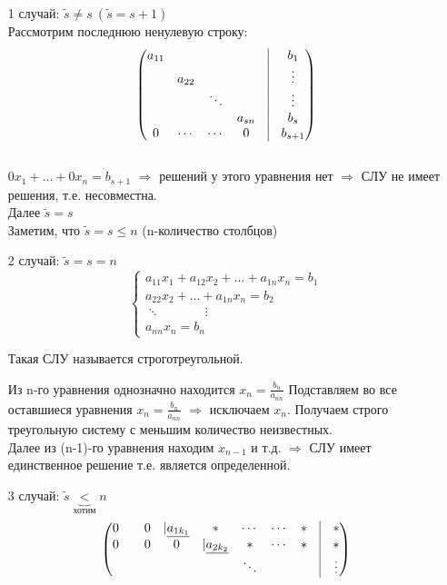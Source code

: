 \documentclass[a4paper, 12pt]{article}
\theoremstyle{definition}
\begin{document}
  \begin{itemize}
    \item[1 случай:]
    $\widetilde{s} \neq s \ (\widetilde{s}=s+1)$ \\ 
    Рассмотрим последнюю ненулевую строку:
    $$\begin{pmatrix}
      a_{11} & \null & \null & \null & \vline & b_1 \\
      \null & a_{22} & \null & \null & \vline & \vdots \\
      \null & \null & \ddots & \null & \vline & \vdots \\
      \null & \null & \null & a_{sn} & \vline & b_s \\
      0 & \cdots & \cdots & 0 & \vline & b_{s+1}
    \end{pmatrix}$$ \\
    $0x_1+...+0x_n=b_{s+1}$ 
    $\Longrightarrow$ решений у этого уравнения нет 
    $\Longrightarrow$ СЛУ не имеет решения, т.е. несовместна. \\
    Далее $\widetilde{s}=s$\\
    Заметим, что $\widetilde{s}=s\leq n$ (n-количество столбцов)
    \item[2 случай:] $\widetilde{s}=s=n$  
    $$\left\{ \begin{aligned}
      a_{11} x_1 + a_{12} x_2+ \dots + a_{1n} x_n = b_1 \\
      a_{22} x_2 + \dots + a_{1n} x_n = b_2 \\ 
      \ddots \ \ \ \ \ \ \ \ \ \ \ \ \ \ \ \ \vdots \ \\
      a_{nn} x_n = b_n
    \end{aligned}
    \right.$$

    Такая СЛУ называется строготреугольной.

    Из n-го уравнения однозначно находится $x_n = \frac{b_n}{a_{nn}}$
    Подставляем во все оставшиеся уравнения $x_n = \frac{b_n}{a_{nn}}$ $\Longrightarrow$ исключаем $x_n$. Получаем строго треугольную систему с меньшим количество неизвестных.  \\
    Далее из (n-1)-го уравнения  находим $x_{n-1}$ и т.д. $\Longrightarrow$ СЛУ имеет единственное решение т.е. является определенной.

    \item[3 случай:] $\widetilde{s}\underbrace{<}_{\text{хотим}} n$ 
  $$\begin{pmatrix}
    0 & \null & 0 & |\underline{a_{1k_1}} & \ast & \cdots & \cdots & \ast & \vline & \ast  \\
    0 & \null & 0 & 0 & |\underline{a_{2k_2}} & \ast & \cdots & \ast & \vline & \ast \\
    \null & \null & \null & \null & \null & \ddots & \null & \null & \vline & \vdots
  \end{pmatrix}$$ 


\end{itemize}
\end{document}
